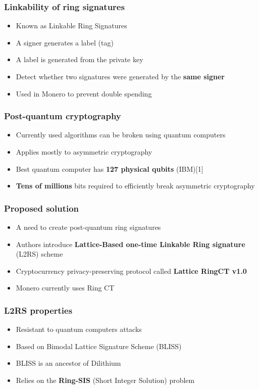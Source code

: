 \documentclass[%
  14pt,       				%
	c,                  %
	aspectratio=1610,   %
	unicode,						%
]{beamer}				    	%
\begin{document}
\begin{frame} 
  \frametitle{Linkability of ring signatures}
  \large{
    \begin{itemize}
      \item Known as Linkable Ring Signatures
      \item A signer generates a label (tag)
      \item A label is generated from the private key
      \item Detect whether two signatures were generated by the \textbf{same signer}
      \item Used in Monero to prevent double spending
    \end{itemize}
  }
\end{frame}

\begin{frame} 
  \frametitle{Post-quantum cryptography}
  \large{
    \begin{itemize}
      \item Currently used algorithms can be broken using quantum computers
      \item Applies mostly to asymmetric cryptography
      \item Best quantum computer has \textbf{127 physical qubits} (IBM)[1]
      \item \textbf{Tens of millions} bits required to efficiently break asymmetric cryptography
    \end{itemize}
  }
\end{frame}

\begin{frame}
  \frametitle{Proposed solution}
  \large{
    \begin{itemize}
      \item A need to create post-quantum ring signatures
      \item Authors introduce \textbf{Lattice-Based one-time Linkable Ring signature} (L2RS) scheme
      \item Cryptocurrency privacy-preserving protocol called \textbf{Lattice RingCT v1.0}
      \item Monero currently uses Ring CT
    \end{itemize}
  }
\end{frame}

\begin{frame}
  \frametitle{L2RS properties}
  \large{
    \begin{itemize}
      \item Resistant to quantum computers attacks
      \item Based on Bimodal Lattice Signature Scheme (BLISS)
      \item BLISS is an ancestor of Dilithium
      \item Relies on the \textbf{Ring-SIS} (Short Integer Solution) problem
    \end{itemize}
  }
\end{frame}
\end{document}
